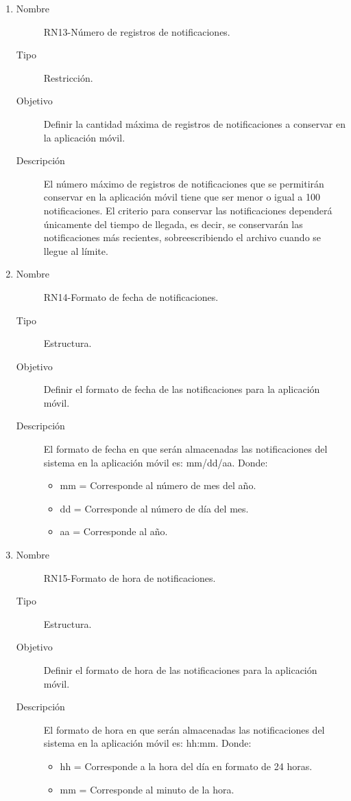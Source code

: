 \begin{enumerate}[label=RN\arabic*.]
\item \label{RN13}
		\begin{description}
			\item[Nombre] RN13-Número de registros de notificaciones.
			\item[Tipo] Restricción.
			\item[Objetivo] Definir la cantidad máxima de registros de notificaciones a conservar en la aplicación móvil.
			\item[Descripción] El número máximo de registros de notificaciones que se permitirán conservar en la aplicación móvil tiene que ser menor o igual a 100 notificaciones. El criterio para conservar las notificaciones dependerá únicamente del tiempo de llegada, es decir, se conservarán las notificaciones más recientes, sobreescribiendo el archivo cuando se llegue al límite.   
		\end{description}
		
\item \label{RN14}
		\begin{description}
			\item[Nombre] RN14-Formato de fecha de notificaciones.
			\item[Tipo] Estructura.
			\item[Objetivo] Definir el formato de fecha de las notificaciones para la aplicación móvil.
			\item[Descripción] El formato de fecha en que serán almacenadas las notificaciones del sistema en la aplicación móvil es: mm/dd/aa.
			Donde:
			\begin{itemize}
			    \item mm = Corresponde al número de mes del año.
		 		\item dd = Corresponde al número de día del mes.
		 		\item aa = Corresponde al año.
		    \end{itemize}
		\end{description}
		
\item \label{RN15}
		\begin{description}
			\item[Nombre] RN15-Formato de hora de notificaciones.
			\item[Tipo] Estructura.
			\item[Objetivo] Definir el formato de hora de las notificaciones para la aplicación móvil.
			\item[Descripción] El formato de hora en que serán almacenadas las notificaciones del sistema en la aplicación móvil es: hh:mm.
			Donde:
			\begin{itemize}
		 		\item hh = Corresponde a la hora del día en formato de 24 horas.
		 		\item mm = Corresponde al minuto de la hora.
		    \end{itemize}
		\end{description}


\end{enumerate}
